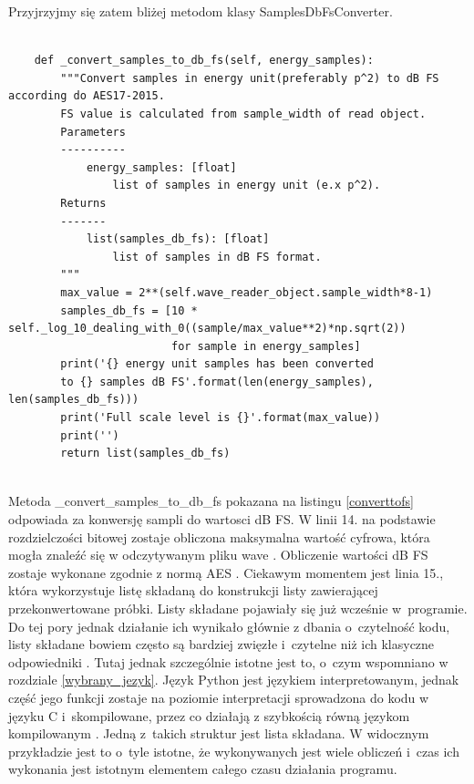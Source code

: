 \documentclass[eng,printmode]{mgr}
\begin{document}
Przyjrzyjmy się zatem bliżej metodom klasy SamplesDbFsConverter.

\begin{minipage}{\linewidth}
\begin{lstlisting}[caption={fragment kodu źródłowego pliku SampledBConverter.py,\newline klasa SamplesDbFSConverter, metoda \_convert\_samples\_to\_db\_fs},captionpos=b,label={converttofs}]

    def _convert_samples_to_db_fs(self, energy_samples):
        """Convert samples in energy unit(preferably p^2) to dB FS according do AES17-2015.
        FS value is calculated from sample_width of read object.
        Parameters
        ----------
            energy_samples: [float]
                list of samples in energy unit (e.x p^2).
        Returns
        -------
            list(samples_db_fs): [float]
                list of samples in dB FS format.
        """
        max_value = 2**(self.wave_reader_object.sample_width*8-1)
        samples_db_fs = [10 * self._log_10_dealing_with_0((sample/max_value**2)*np.sqrt(2))
                         for sample in energy_samples]
        print('{} energy unit samples has been converted
        to {} samples dB FS'.format(len(energy_samples), len(samples_db_fs)))
        print('Full scale level is {}'.format(max_value))
        print('')
        return list(samples_db_fs)
    
\end{lstlisting}
\end{minipage}

Metoda \_convert\_samples\_to\_db\_fs pokazana na listingu \ref{converttofs} odpowiada za konwersję sampli do wartosci dB FS. W linii 14. na podstawie rozdzielczości bitowej zostaje obliczona maksymalna wartość cyfrowa, która mogła znaleźć się w odczytywanym pliku wave \cite{Cyfrowe_przetwarzanie_sygnalow}. Obliczenie wartości dB FS zostaje wykonane zgodnie z normą AES \cite{AES17}. Ciekawym momentem jest linia 15., która wykorzystuje listę składaną do konstrukcji listy zawierającej przekonwertowane próbki. Listy składane pojawiały się już wcześnie w~programie. Do tej pory jednak działanie ich wynikało głównie z dbania o~czytelność kodu, listy składane bowiem często są bardziej zwięzłe i~czytelne niż ich klasyczne odpowiedniki \cite{Python_data_structures}. Tutaj jednak szczególnie istotne jest to, o~czym wspomniano w rozdziale \ref{wybrany_jezyk}. Język Python jest językiem interpretowanym, jednak część jego funkcji zostaje na poziomie interpretacji sprowadzona do kodu w języku C i~skompilowane, przez co działają z szybkością równą językom kompilowanym \cite{Wprowadzenie_python}. Jedną z~takich struktur jest lista składana. W widocznym przykładzie jest to o~tyle istotne, że wykonywanych jest wiele obliczeń i~czas ich wykonania jest istotnym elementem całego czasu działania programu.
\end{document}

